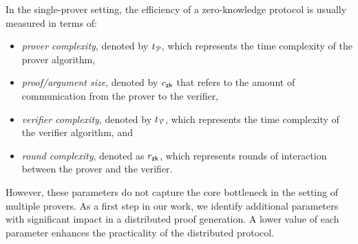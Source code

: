 In the single-prover setting, the efficiency of a zero-knowledge protocol is usually measured in terms of: 
\begin{itemize}
	\item {\em prover complexity}, denoted by $t_{\mathcal{P}}$, which represents the time complexity of the prover algorithm,
	\item {\em proof/argument size}, denoted by $c_\mathsf{zk}$ that refers to the amount of communication from the prover to the verifier,
	\item {\em verifier complexity}, denoted by $t_{\mathcal{V}}$, which represents the time complexity of the verifier algorithm, and
	\item {\em round complexity}, denoted as $r_\mathsf{zk}$, which represents rounds of interaction between the prover and the verifier. %
\end{itemize} 
However, these parameters do not capture the core bottleneck in the setting of multiple provers.
As a first step in our work, we identify additional parameters with significant impact in a distributed proof generation. A lower value of each parameter enhances the practicality of the distributed protocol.


